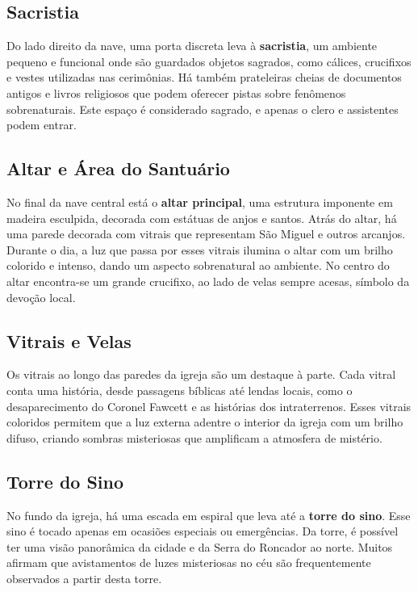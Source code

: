 \subsection{Sacristia}

Do lado direito da nave, uma porta discreta leva à \textbf{sacristia}, um ambiente pequeno e funcional onde são guardados objetos sagrados, como cálices, crucifixos e vestes utilizadas nas cerimônias. Há também prateleiras cheias de documentos antigos e livros religiosos que podem oferecer pistas sobre fenômenos sobrenaturais. Este espaço é considerado sagrado, e apenas o clero e assistentes podem entrar.

\subsection{Altar e Área do Santuário}

No final da nave central está o \textbf{altar principal}, uma estrutura imponente em madeira esculpida, decorada com estátuas de anjos e santos. Atrás do altar, há uma parede decorada com vitrais que representam São Miguel e outros arcanjos. Durante o dia, a luz que passa por esses vitrais ilumina o altar com um brilho colorido e intenso, dando um aspecto sobrenatural ao ambiente. No centro do altar encontra-se um grande crucifixo, ao lado de velas sempre acesas, símbolo da devoção local.

\subsection{Vitrais e Velas}

Os vitrais ao longo das paredes da igreja são um destaque à parte. Cada vitral conta uma história, desde passagens bíblicas até lendas locais, como o desaparecimento do Coronel Fawcett e as histórias dos intraterrenos. Esses vitrais coloridos permitem que a luz externa adentre o interior da igreja com um brilho difuso, criando sombras misteriosas que amplificam a atmosfera de mistério.

\subsection{Torre do Sino}

No fundo da igreja, há uma escada em espiral que leva até a \textbf{torre do sino}. Esse sino é tocado apenas em ocasiões especiais ou emergências. Da torre, é possível ter uma visão panorâmica da cidade e da Serra do Roncador ao norte. Muitos afirmam que avistamentos de luzes misteriosas no céu são frequentemente observados a partir desta torre.

